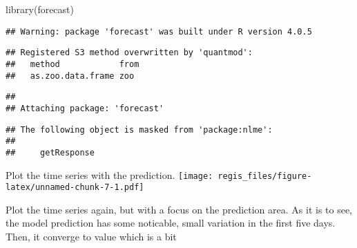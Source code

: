 \documentclass[
]{article}
\newenvironment{Shaded}{\begin{snugshade}}{\end{snugshade}}
\newcommand{\AttributeTok}[1]{\textcolor[rgb]{0.77,0.63,0.00}{#1}}
\newcommand{\DecValTok}[1]{\textcolor[rgb]{0.00,0.00,0.81}{#1}}
\newcommand{\FunctionTok}[1]{\textcolor[rgb]{0.00,0.00,0.00}{#1}}
\newcommand{\NormalTok}[1]{#1}
\newcommand{\OtherTok}[1]{\textcolor[rgb]{0.56,0.35,0.01}{#1}}
\newcommand{\SpecialCharTok}[1]{\textcolor[rgb]{0.00,0.00,0.00}{#1}}
\begin{document}
\begin{Shaded}
\begin{Highlighting}[]
\FunctionTok{library}\NormalTok{(forecast)}
\end{Highlighting}
\end{Shaded}

\begin{verbatim}
## Warning: package 'forecast' was built under R version 4.0.5
\end{verbatim}

\begin{verbatim}
## Registered S3 method overwritten by 'quantmod':
##   method            from
##   as.zoo.data.frame zoo
\end{verbatim}

\begin{verbatim}
## 
## Attaching package: 'forecast'
\end{verbatim}

\begin{verbatim}
## The following object is masked from 'package:nlme':
## 
##     getResponse
\end{verbatim}

\begin{Shaded}
\end{Shaded}

Plot the time series with the prediction.
\texttt{[image: regis\_files/figure-latex/unnamed-chunk-7-1.pdf]}

Plot the time series again, but with a focus on the prediction area. As
it is to see, the model prediction has some noticable, small variation
in the first five days. Then, it converge to value which is a bit
\end{document}
